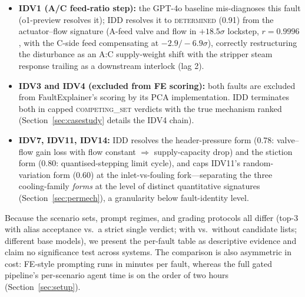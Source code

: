 \documentclass[preprint,10pt]{elsarticle}
\begin{document}
\begin{itemize}
\item \textbf{IDV1 (A/C feed-ratio step):} the GPT-4o baseline mis-diagnoses this fault (o1-preview resolves it); IDD resolves it to \mbox{\textsc{determined}} (0.91) from the actuator--flow signature (A-feed valve and flow in $+18.5\sigma$ lockstep, $r{=}0.9996$, with the C-side feed compensating at $-2.9/-6.9\sigma$), correctly restructuring the disturbance as an A:C supply-weight shift with the stripper steam response trailing as a downstream interlock (lag 2).
\item \textbf{IDV3 and IDV4 (excluded from FE scoring):} both faults are excluded from FaultExplainer's scoring by its PCA implementation. IDD terminates both in capped \mbox{\textsc{competing\_set}} verdicts with the true mechanism ranked (Section~\ref{sec:casestudy} details the IDV4 chain).
\item \textbf{IDV7, IDV11, IDV14:} IDD resolves the header-pressure form (0.78: valve--flow gain loss with flow constant $\Rightarrow$ supply-capacity drop) and the stiction form (0.80: quantised-stepping limit cycle), and caps IDV11's random-variation form (0.60) at the inlet-vs-fouling fork---separating the three cooling-family \emph{forms} at the level of distinct quantitative signatures (Section~\ref{sec:permech}), a granularity below fault-identity level.
\end{itemize}

Because the scenario sets, prompt regimes, and grading protocols all differ (top-3 with alias acceptance vs.\ a strict single verdict; with vs.\ without candidate lists; different base models), we present the per-fault table as descriptive evidence and claim no significance test across systems. The comparison is also asymmetric in cost: FE-style prompting runs in minutes per fault, whereas the full gated pipeline's per-scenario agent time is on the order of two hours (Section~\ref{sec:setup}).
\end{document}
